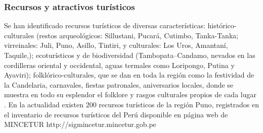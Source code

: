 \subsubsection{Recursos y atractivos turísticos}
Se han identificado recursos turísticos de diversas características: histórico-culturales (restos arqueológicos: Sillustani, Pucará, Cutimbo, Tanka-Tanka; virreinales: Juli, Puno, Asillo, Tintiri, y culturales: Los Uros, Amantaní, Taquile,); ecoturísticos y de biodiversidad (Tambopata–Candamo, nevados en las cordilleras oriental y occidental, aguas termales como Loripongo, Putina y Ayaviri); folklórico-culturales, que se dan en toda la región como la festividad de la Candelaria, carnavales, fiestas patronales, aniversarios locales, donde se muestra en todo su esplendor el folklore y rasgos culturales propios de cada lugar \cite{2016CarpetaPeru}. En la actualidad existen 200 recursos turísticos de la región Puno, registrados en el inventario de recursos turísticos del Perú disponible en página web de MINCETUR http://sigmincetur.mincetur.gob.pe 




